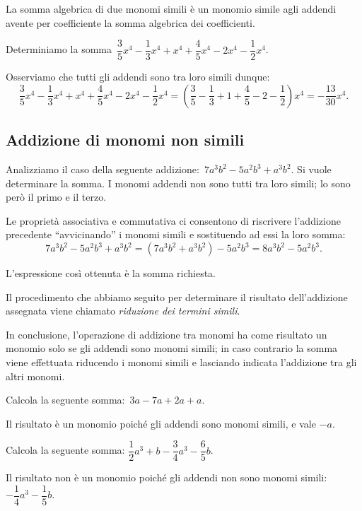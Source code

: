 \osservazione La somma algebrica di due monomi simili è un monomio simile agli
addendi avente per coefficiente la somma algebrica dei coefficienti.

\begin{exrig}
 \begin{esempio}
Determiniamo la somma~$\dfrac{3}{5}x^{{4}}-\dfrac{1}{3}x^{{4}}+x^{{4}}+\dfrac{4}{5}x^{{4}}-2x^{{4}}-\dfrac{1}{2}x^{{4}}$.

Osserviamo che tutti gli addendi sono tra loro simili dunque:
\[\frac{3}{5}x^{{4}}-\frac{1}{3}x^{{4}}+x^{{4}}+\frac{4}{5}x^{{4}}-2x^{{4}}-\frac{1}{2}x^{{4}}=\left(\frac{3}{5}-\frac{1}{3}+1+\frac{4}{5}-2-\frac{1}{2}\right)x^{{4}}=-{\frac{13}{30}}x^{{4}}.\]
\end{esempio}
\end{exrig}
\subsection{Addizione di monomi non simili}

Analizziamo il caso della seguente
addizione:~$7a^{3}b^{2}-5a^{2}b^{3}+a^{3}b^{2}$. Si vuole determinare
la somma. I monomi addendi non sono tutti tra loro simili; lo sono
però il primo e il terzo.

Le proprietà associativa e commutativa ci consentono di riscrivere
l'addizione precedente
``avvicinando'' i monomi simili e
sostituendo ad essi la loro
somma:
\[7a^{3}b^{2}-5a^{2}b^{3}+a^{3}b^{2}=(7a^{3}b^{2}+a^{3}b^{2})-5a^{2}b^{3}=8a^{3}b^{2}-5a^{2}b^{3}.\]

L'espressione così ottenuta è la somma richiesta.

\vspazio\ovalbox{\risolvi \ref{ese:9.25}}\vspazio

Il procedimento che abbiamo seguito per determinare il risultato
dell'addizione assegnata viene chiamato
\emph{riduzione dei termini simili}.

In conclusione, l'operazione di addizione tra monomi ha
come risultato un monomio solo se gli addendi sono monomi simili; in
caso contrario la somma viene effettuata riducendo i monomi simili e
lasciando indicata l'addizione tra gli altri monomi.

\begin{exrig}
 \begin{esempio}
Calcola la seguente somma:~$3a-7a+2a+a$.

Il risultato è un monomio poiché gli addendi sono monomi
simili, e vale $-a$.
 \end{esempio}

 \begin{esempio}
Calcola la seguente somma:
$\dfrac{1}{2}a^{3}+b-\dfrac{3}{4}a^{3}-\dfrac{6}{5}b$.

Il risultato non è un monomio poiché gli addendi non sono
monomi simili: $-{\dfrac{1}{4}}a^{3}-\dfrac{1}{5}b$.
 \end{esempio}
\end{exrig}

